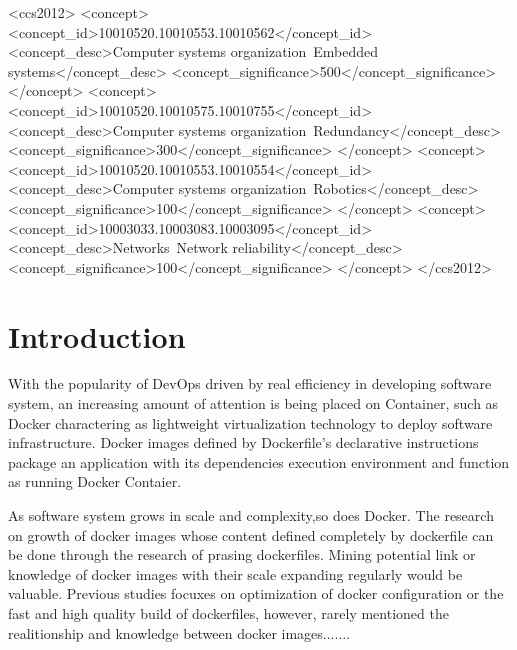 \documentclass[sigconf]{acmart}
\begin{document}
\begin{CCSXML}
<ccs2012>
 <concept>
  <concept_id>10010520.10010553.10010562</concept_id>
  <concept_desc>Computer systems organization~Embedded systems</concept_desc>
  <concept_significance>500</concept_significance>
 </concept>
 <concept>
  <concept_id>10010520.10010575.10010755</concept_id>
  <concept_desc>Computer systems organization~Redundancy</concept_desc>
  <concept_significance>300</concept_significance>
 </concept>
 <concept>
  <concept_id>10010520.10010553.10010554</concept_id>
  <concept_desc>Computer systems organization~Robotics</concept_desc>
  <concept_significance>100</concept_significance>
 </concept>
 <concept>
  <concept_id>10003033.10003083.10003095</concept_id>
  <concept_desc>Networks~Network reliability</concept_desc>
  <concept_significance>100</concept_significance>
 </concept>
</ccs2012>
\end{CCSXML}






\maketitle

\section{Introduction}
With the popularity of DevOps driven by real efficiency in developing software system, an increasing amount of attention is being placed on Container, such as Docker charactering as lightweight virtualization technology to deploy software infrastructure. Docker images defined by Dockerfile's declarative instructions package an application with its dependencies execution environment and function as running Docker Contaier.

As software system grows in scale and complexity,so does Docker. The research on growth of docker images whose content defined completely by dockerfile can be done through the research of prasing dockerfiles. Mining potential link or knowledge of docker images with their scale expanding regularly would be valuable. Previous studies focuxes on optimization of docker configuration or the fast and high quality build of dockerfiles, however, rarely mentioned the realitionship and knowledge between docker images.......
 
\end{document}
